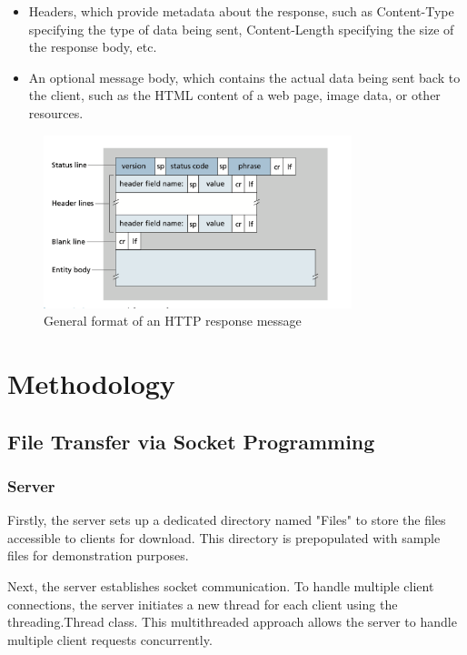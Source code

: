 \documentclass[11pt]{article}
\begin{document}
\begin{itemize}
\begin{itemize}
        \item Headers, which provide metadata about the response, such as Content-Type specifying the type of data being sent, Content-Length specifying the size of the response body, etc.
        \item An optional message body, which contains the actual data being sent back to the client, such as the HTML content of a web page, image data, or other resources.
    \end{itemize}
    \begin{figure}[h]
        \centering
        \includegraphics[width=0.8\textwidth]{response.png}
        \caption{General format of an HTTP response message}
        \label{fig:response_message}
    \end{figure}
\end{itemize}
\section{Methodology}
    \subsection{File Transfer via Socket Programming}
        \subsubsection{Server}
Firstly, the server sets up a dedicated directory named "Files" to store the files accessible to clients for download. This directory is prepopulated with sample files for demonstration purposes.

Next, the server establishes socket communication. To handle multiple client connections, the server initiates a new thread for each client using the threading.Thread class. This multithreaded approach allows the server to handle multiple client requests concurrently.
\end{document}
